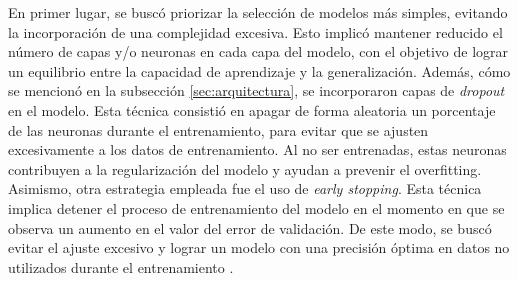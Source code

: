 En primer lugar, se buscó priorizar la selección 
de modelos más simples, evitando la incorporación de una complejidad excesiva. Esto implicó 
mantener reducido el número de capas y/o neuronas en cada capa del modelo, con el objetivo de 
lograr un equilibrio entre la capacidad de aprendizaje y la generalización.
Además, cómo se mencionó en la subsección \ref{sec:arquitectura}, se incorporaron capas 
de \emph{dropout} en el modelo. Esta técnica consistió en apagar de forma aleatoria un 
porcentaje de las neuronas durante el entrenamiento, para evitar que se ajusten excesivamente 
a los datos de entrenamiento. Al no ser entrenadas, estas neuronas contribuyen a la 
regularización del modelo y ayudan a prevenir el overfitting.
Asimismo, otra estrategia empleada fue el uso de \emph{early stopping}. Esta técnica implica detener 
el proceso de entrenamiento del modelo en el momento en que se observa un aumento en el valor 
del error de validación. De este modo, se buscó evitar el ajuste excesivo y lograr un modelo 
con una precisión óptima en datos no utilizados durante el entrenamiento \citep{CITE:44}.
